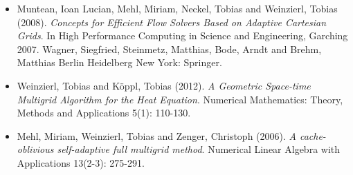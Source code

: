 \begin{itemize}
  \item   Muntean, Ioan Lucian, Mehl, Miriam, Neckel, Tobias and Weinzierl,
  Tobias (2008). {\em Concepts for Efficient Flow Solvers Based on Adaptive
  Cartesian Grids}. In High Performance Computing in Science and Engineering,
  Garching 2007. Wagner, Siegfried, Steinmetz, Matthias, Bode, Arndt and Brehm,
  Matthias Berlin Heidelberg New York: Springer.
  \item Weinzierl, Tobias and K\"oppl, Tobias (2012). {\em A Geometric
  Space-time Multigrid Algorithm for the Heat Equation}. Numerical Mathematics:
  Theory, Methods and Applications 5(1): 110-130.
  \item Mehl, Miriam, Weinzierl, Tobias and Zenger, Christoph (2006). {\em A
  cache-oblivious self-adaptive full multigrid method}. Numerical Linear Algebra
  with Applications 13(2-3): 275-291.
\end{itemize}
